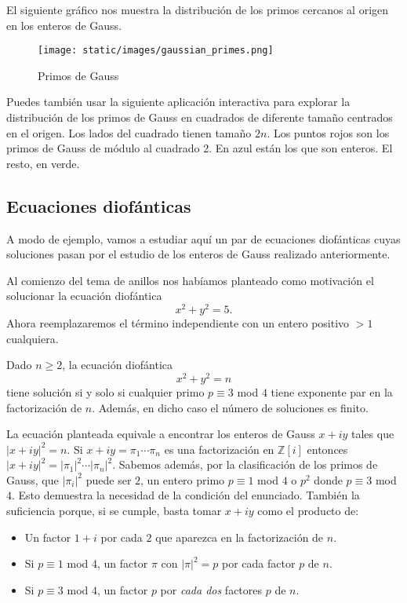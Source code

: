 El siguiente gráfico nos muestra la distribución de los primos cercanos
al origen en los enteros de Gauss.

\begin{figure}
\centering
\texttt{[image: static/images/gaussian\_primes.png]}
\caption{Primos de Gauss}
\end{figure}

Puedes también usar la siguiente aplicación interactiva para explorar la
distribución de los primos de Gauss en cuadrados de diferente tamaño
centrados en el origen. Los lados del cuadrado tienen tamaño \(2n\). Los
puntos rojos son los primos de Gauss de módulo al cuadrado 2. En azul
están los que son enteros. El resto, en verde.

\hypertarget{ecuaciones-diofuxe1nticas}{%
\subsection{Ecuaciones diofánticas}\label{ecuaciones-diofuxe1nticas}}

A modo de ejemplo, vamos a estudiar aquí un par de ecuaciones
diofánticas cuyas soluciones pasan por el estudio de los enteros de
Gauss realizado anteriormente.

Al comienzo del tema de anillos nos habíamos planteado como motivación
el solucionar la ecuación diofántica \[x^2+y^2=5.\] Ahora reemplazaremos
el término independiente con un entero positivo \(>1\) cualquiera.


Dado \(n\geq 2\), la ecuación diofántica \[x^2+y^2=n\] tiene solución si
y solo si cualquier primo \(p\equiv 3\) mod \(4\) tiene exponente par en
la factorización de \(n\). Además, en dicho caso el número de soluciones
es finito. 


La ecuación planteada equivale a encontrar los enteros de Gauss \(x+iy\)
tales que \(|x+iy|^2=n\). Si \(x+iy=\pi_1\cdots\pi_n\) es una
factorización en \(\mathbb Z[i]\) entonces
\(|x+iy|^2=|\pi_1|^2\cdots|\pi_n|^2\). Sabemos además, por la
clasificación de los primos de Gauss, que \(|\pi_i|^2\) puede ser \(2\),
un entero primo \(p\equiv 1\) mod \(4\) o \(p^2\) donde \(p\equiv 3\)
mod \(4\). Esto demuestra la necesidad de la condición del enunciado.
También la suficiencia porque, si se cumple, basta tomar \(x+iy\) como
el producto de:

\begin{itemize}
\item
  Un factor \(1+i\) por cada \(2\) que aparezca en la factorización de
  \(n\).
\item
  Si \(p\equiv 1\) mod \(4\), un factor \(\pi\) con \(|\pi|^2=p\) por
  cada factor \(p\) de \(n\).
\item
  Si \(p\equiv 3\) mod \(4\), un factor \(p\) por \emph{cada dos}
  factores \(p\) de \(n\).
\end{itemize}

